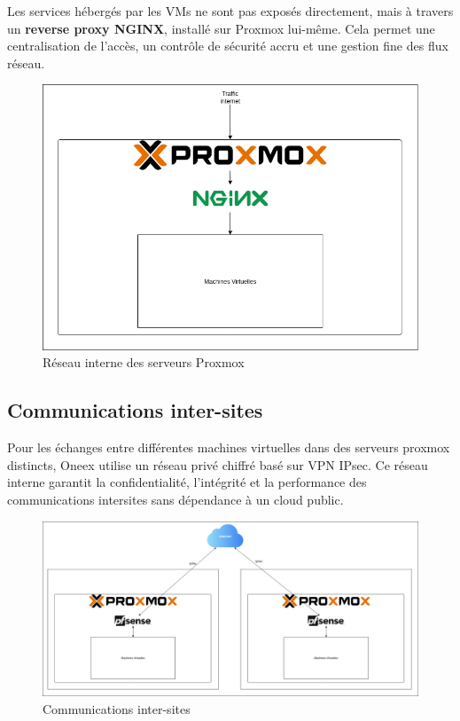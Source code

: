Les services hébergés par les VMs ne sont pas exposés directement, mais à travers un \textbf{reverse proxy NGINX}, installé sur Proxmox lui-même. Cela permet une centralisation de l’accès, un contrôle de sécurité accru et une gestion fine des flux réseau.

\begin{figure} [H]
	\centering
	\includegraphics[width=.5\textwidth]{figures/Reseau inter proxmox.png}
	\caption{Réseau interne des serveurs Proxmox}
\end{figure}

\subsection{Communications inter-sites}

Pour les échanges entre différentes machines virtuelles dans des serveurs proxmox distincts, Oneex utilise un réseau privé chiffré basé sur VPN IPsec. Ce réseau interne garantit la confidentialité, l’intégrité et la performance des communications intersites sans dépendance à un cloud public.

\begin{figure} [H]
	\centering
	\includegraphics[width= \textwidth]{figures/Reseau intra proxmox.png}
	\caption{Communications inter-sites}
\end{figure}